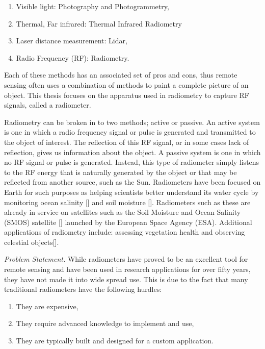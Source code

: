 \begin{enumerate}
\item Visible light: Photography and Photogrammetry,
\item Thermal, Far infrared: Thermal Infrared Radiometry
\item Laser distance measurement: Lidar,
\item Radio Frequency (RF): Radiometry.
\end{enumerate}

Each of these methods has an associated set of pros and cons, thus remote sensing often uses a combination of methods to paint a complete picture of an object.  This thesis focuses on the apparatus used in radiometry to capture RF signals, called a radiometer.

Radiometry can be broken in to two methods; active or passive.  An active system is one in which a radio frequency signal or pulse is generated and transmitted to the object of interest.  The reflection of this RF signal, or in some cases lack of reflection, gives us information about the object.  A passive system is one in which no RF signal or pulse is generated.  Instead, this type of radiometer simply listens to the RF energy that is naturally generated by the object or that may be reflected from another source, such as the Sun.  Radiometers have been focused on Earth for such purposes as helping scientists better understand its water cycle by monitoring ocean salinity [\cite{Hardy}] and soil moisture [\cite{Liu}].  Radiometers such as these are already in service on satellites such as the Soil Moisture and Ocean Salinity (SMOS) satellite [\cite{McMullan}] launched by the European Space Agency (ESA).  Additional applications of radiometry include: assessing vegetation health and observing celestial objects[\cite{ulaby2014}].

\emph{Problem Statement.}  While radiometers have proved to be an excellent tool for remote sensing and have been used in research applications for over fifty years, they have not made it into wide spread use.  This is due to the fact that many traditional radiometers have the following hurdles:

\begin{enumerate}
\item They are expensive,
\item They require advanced knowledge to implement and use,
\item They are typically built and designed for a custom application.
\end{enumerate}

